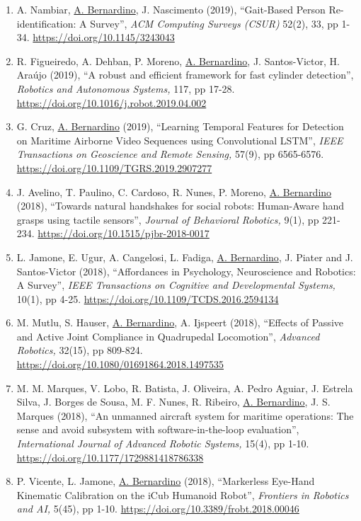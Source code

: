\begin{enumerate}
\item
  A. Nambiar, \ul{A. Bernardino}, J. Nascimento (2019), ``Gait-Based
  Person Re-identification: A Survey'', \emph{ACM Computing Surveys
  (CSUR)} 52(2), 33, pp 1-34. \url{https://doi.org/10.1145/3243043}~
\item
  R. Figueiredo, A. Dehban, P. Moreno, \ul{A. Bernardino}, J.
  Santos-Victor, H. Araújo (2019), ``A robust and efficient framework
  for fast cylinder detection'', \emph{Robotics and Autonomous Systems,}
  117, pp 17-28. \url{https://doi.org/10.1016/j.robot.2019.04.002}~
\item
  G. Cruz, \ul{A. Bernardino} (2019), ``Learning Temporal Features for
  Detection on Maritime Airborne Video Sequences using Convolutional
  LSTM'', \emph{IEEE Transactions on Geoscience and Remote Sensing,}
  57(9), pp 6565-6576.
  \url{https://doi.org/10.1109/TGRS.2019.2907277}~~~
\item
  J. Avelino, T. Paulino, C. Cardoso, R. Nunes, P. Moreno, \ul{A.
  Bernardino} (2018), ``Towards natural handshakes for social robots:
  Human-Aware hand grasps using tactile sensors'', \emph{Journal of
  Behavioral Robotics,} 9(1), pp 221-234.
  \url{https://doi.org/10.1515/pjbr-2018-0017}~
\item
  L. Jamone, E. Ugur, A. Cangelosi, L. Fadiga, \ul{A. Bernardino}, J.
  Piater and J. Santos-Victor (2018), ``Affordances in Psychology,
  Neuroscience and Robotics: A Survey'', \emph{IEEE Transactions on
  Cognitive and Developmental Systems,} 10(1), pp 4-25.
  \url{https://doi.org/10.1109/TCDS.2016.2594134}~
\item
  M. Mutlu, S. Hauser, \ul{A. Bernardino}, A. Ijspeert (2018), ``Effects
  of Passive and Active Joint Compliance in Quadrupedal Locomotion'',
  \emph{Advanced Robotics,} 32(15), pp 809-824.
  \url{https://doi.org/10.1080/01691864.2018.1497535}~
\item
  M. M. Marques, V. Lobo, R. Batista, J. Oliveira, A. Pedro Aguiar, J.
  Estrela Silva, J. Borges de Sousa, M. F. Nunes, R. Ribeiro, \ul{A.
  Bernardino}, J. S. Marques (2018), ``An unmanned aircraft system for
  maritime operations: The sense and avoid subsystem with
  software-in-the-loop evaluation'', \emph{International Journal of
  Advanced Robotic Systems,} 15(4), pp 1-10.
  \url{https://doi.org/10.1177/1729881418786338}~
\item
  P. Vicente, L. Jamone, \ul{A. Bernardino} (2018), ``Markerless
  Eye-Hand Kinematic Calibration on the iCub Humanoid Robot'',
  \emph{Frontiers in Robotics and AI,} 5(45), pp 1-10.
  \url{https://doi.org/10.3389/frobt.2018.00046}~

\end{enumerate}
